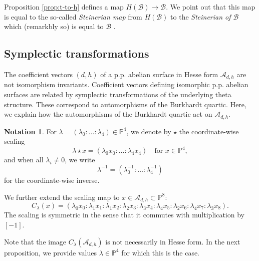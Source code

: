 \documentclass[11pt]{amsart}
\theoremstyle{definition}
\newtheorem{notation}[theorem]{Notation}
\newcommand{\B}{\mathcal{B}}
\newcommand{\A}{\mathcal{A}}
\newcommand{\PP}{\mathbb{P}}
\begin{document}
Proposition \ref{prop:t-to-h} defines a map $H(\B) \to \B$. We point out that this map is equal to the so-called {\em Steinerian map} from $H(\B)$ to the {\em Steinerian of $\B$} which (remarkbly so) is equal to $\B$ \cite[Section B.1.1.3]{hunt2006burkhardt}.

					
\subsection{Symplectic transformations} \label{subsec:symplectic-trafos}
	
	The coefficient vectors $(d,h)$ of a p.p. abelian surface in Hesse form $\A_{d,h}$ are not isomorphism invariants. Coefficient vectors defining isomorphic p.p. abelian surfaces are related by symplectic transformations of the underlying theta structure. These correspond to automorphisms of the Burkhardt quartic. 
	Here, we explain how the automorphisms of the Burkhardt quartic act on $\A_{d,h}$.
	
	\begin{notation} \label{not:scaling}
		For $\lambda = (\lambda_0: \dots : \lambda_4) \in \PP^4$, we denote by $\star$ the coordinate-wise scaling
		\[
		\lambda \star x = (\lambda_0 x_0: \dots:  \lambda_4 x_4) \quad \text{for } x \in \PP^4,
		\]
		and when all $\lambda_i \neq 0$, we write 
		\[
		\lambda^{-1} = (\lambda_0^{-1} : \dots : \lambda_4^{-1})
		\]
		for the coordinate-wise inverse. 
		
		We further extend the scaling map to $ x \in \A_{d,h} \subset \PP^8$:
		\begin{equation*}
			C_\lambda(x) = (\lambda_0 x_0 : \lambda_1 x_1 : \lambda_1 x_2 : \lambda_2 x_3 : \lambda_3 x_4 : \lambda_4 x_5: \lambda_2 x_6 : \lambda_4 x_7 : \lambda_3 x_8).
		\end{equation*}
		The scaling is symmetric in the sense that it commutes with multiplication by $[-1]$.
	\end{notation}
	
	Note that the image $C_\lambda(\A_{d,h})$ is not necessarily in Hesse form. In the next proposition, we provide values $\lambda \in \PP^4$ for which this is the case.
	
\end{document}
